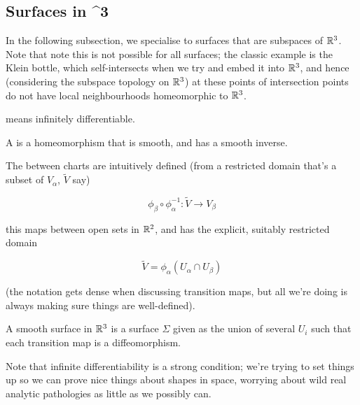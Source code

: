 \documentclass[11pt]{scrartcl}
\begin{document}
\subsection{Surfaces in \RR^3}

In the following subsection, we specialise to surfaces that are subspaces of $\mathbb R^3$. Note that note this is not possible for all surfaces; the classic example is the Klein bottle, which self-intersects when we try and embed it into $\mathbb R^3$, and hence (considering the subspace topology on $\mathbb R^3$) at these points of intersection points do not have local neighbourhoods homeomorphic to $\mathbb R^3$.

\begin{definition}
 means infinitely differentiable.
\end{definition}

\begin{definition}
A  is a homeomorphism that is smooth, and has a smooth inverse.
\end{definition}

\begin{definition}

The  between charts are intuitively defined (from a restricted domain that's a subset of $V_\alpha$, $\tilde{V}$ say)

\begin{equation}
    \phi_\beta \circ \phi_\alpha^{-1} : \tilde{V} \rightarrow V_\beta
\end{equation}

this maps between open sets in $\mathbb R^2$, and has the explicit, suitably restricted domain

\begin{equation}
    \tilde{V} = \phi_\alpha(U_\alpha \cap U_\beta)
\end{equation}

(the notation gets dense when discussing transition maps, but all we're doing is always making sure things are well-defined).
\end{definition}

\begin{definition}

A smooth surface in $\mathbb R^3$ is a surface $\Sigma$ given as the union of several $U_i$ such that each transition map is a diffeomorphism.
\end{definition}

\begin{remark}
Note that infinite differentiability is a strong condition; we're trying to set things up so we can prove nice things about shapes in space, worrying about wild real analytic pathologies as little as we possibly can.
\end{remark}
\end{document}
